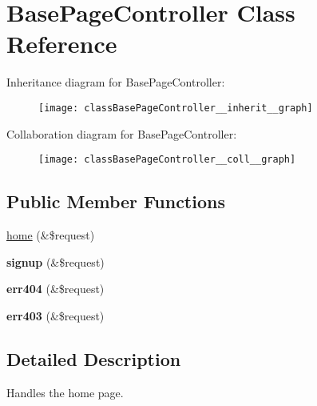 \hypertarget{classBasePageController}{\section{Base\+Page\+Controller Class Reference}
\label{classBasePageController}
}


Inheritance diagram for Base\+Page\+Controller\+:\nopagebreak
\begin{figure}[H]
\begin{center}
\leavevmode
\texttt{[image: classBasePageController\_\_inherit\_\_graph]}
\end{center}
\end{figure}


Collaboration diagram for Base\+Page\+Controller\+:\nopagebreak
\begin{figure}[H]
\begin{center}
\leavevmode
\texttt{[image: classBasePageController\_\_coll\_\_graph]}
\end{center}
\end{figure}
\subsection*{Public Member Functions}
\begin{DoxyCompactItemize}
\item 
\hyperlink{classBasePageController_af9e63d62a5b86ea45c733a80abc58715}{home} (\&\$request)
\item 
\hypertarget{classBasePageController_a26864cbbdf6ced03397b1960f160b0eb}{{\bfseries signup} (\&\$request)}\label{classBasePageController_a26864cbbdf6ced03397b1960f160b0eb}

\item 
\hypertarget{classBasePageController_a0442c7e815c3940f05f007be6549833c}{{\bfseries err404} (\&\$request)}\label{classBasePageController_a0442c7e815c3940f05f007be6549833c}

\item 
\hypertarget{classBasePageController_a984b448e25573a6de434b03e9f0c2795}{{\bfseries err403} (\&\$request)}\label{classBasePageController_a984b448e25573a6de434b03e9f0c2795}

\end{DoxyCompactItemize}


\subsection{Detailed Description}
Handles the home page.

